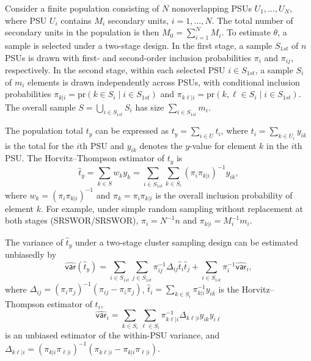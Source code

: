 Consider a finite population consisting of \(N\) nonoverlapping PSUs \(U_1, \ldots, U_N\), where PSU \(U_i\) contains \(M_i\) secondary units, \(i = 1, \ldots, N\). The total number of secondary units in the population is then \(M_0 = \sum_{i=1}^N M_i\). To estimate \(\theta\), a sample is selected under a two-stage design. In the first stage, a sample \(\textrm{$S$}_{1st}\) of \(n\) PSUs is drawn with first- and second-order inclusion probabilities \(\pi_i\) and \(\pi_{ij}\), respectively. In the second stage, within each selected PSU \(i \in \textrm{$S$}_{1st}\), a sample \(\textrm{$S$}_i\) of \(m_i\) elements is drawn independently across PSUs, with conditional inclusion probabilities \(\pi_{k|i} = \mathrm{pr}(k \in \textrm{$S$}_i \mid i \in \textrm{$S$}_{1st})\) and \(\pi_{k\textrm{$\ell$}|i} = \mathrm{pr}(k, \textrm{$\ell$}\in \textrm{$S$}_i \mid i \in \textrm{$S$}_{1st})\). The overall sample \(\textrm{$S$}= \bigcup_{i \in \textrm{$S$}_{1st}} \textrm{$S$}_i\) has size \(\sum_{i \in \textrm{$S$}_{1st}} m_i\).

The population total \(t_y\) can be expressed as \(t_y = \sum_{i \in U} t_i\), where \(t_i = \sum_{k \in U_i} y_{ik}\) is the total for the \(i\)th PSU and \(y_{ik}\) denotes the \(y\)-value for element \(k\) in the \(i\)th PSU. The Horvitz--Thompson estimator of \(t_y\) is
\[
    \hat{t}_{y}=\sum_{k \in \textrm{$S$}}w_k y_{k}=\sum_{i \in \textrm{$S$}_{1st}} \sum_{k \in \textrm{$S$}_i} (\pi_i \pi_{k |i})^{-1} y_{ik},
\]
where \(w_k = (\pi_i \pi_{k|i})^{-1}\) and \(\pi_k = \pi_i \pi_{k|i}\) is the overall inclusion probability of element \(k\). For example, under simple random sampling without replacement at both stages (SRSWOR/SRSWOR), \(\pi_i = N^{-1}n\) and \(\pi_{k|i} = M_i^{-1}m_i\).

The variance of \(\hat t_{y}\) under a two-stage cluster sampling design can be estimated unbiasedly by
\begin{equation}
    \hat {\mathsf{var}}(\hat {t}_{y})=\sum_{i \in \textrm{$S$}_{1st}}\sum_{j\in \textrm{$S$}_{1st}} \pi_{ij}^{-1}\Delta_{ij} \hat {t}_i \hat {t}_j  +\sum_{i \in \textrm{$S$}_{1st}}\pi_i^{-1}\hat {\mathsf{var}}_i,
\label{eq:VarHat2Stage}
\end{equation}
where \(\Delta_{ij} = (\pi_i \pi_j)^{-1}(\pi_{ij}-\pi_i \pi_j)\), \(\hat t_i=\sum_{k \in \textrm{$S$}_i} \pi_{k|i}^{-1} y_{ik}\) is the Horvitz--Thompson estimator of \(t_i\),
\[
    \hat {\mathsf{var}}_i=\sum_{k\in \textrm{$S$}_i}\sum_{\textrm{$\ell$}\in \textrm{$S$}_i} \pi_{k\textrm{$\ell$}|i}^{-1}\Delta_{k\textrm{$\ell$}|i} y_{ik} y_{i\textrm{$\ell$}}
\]
is an unbiased estimator of the within-PSU variance, and \(\Delta_{k\textrm{$\ell$}|i}=(\pi_{k|i}\pi_{\textrm{$\ell$}|i})^{-1}(\pi_{k\textrm{$\ell$}|i}-\pi_{k|i}\pi_{\textrm{$\ell$}|i}).\)

